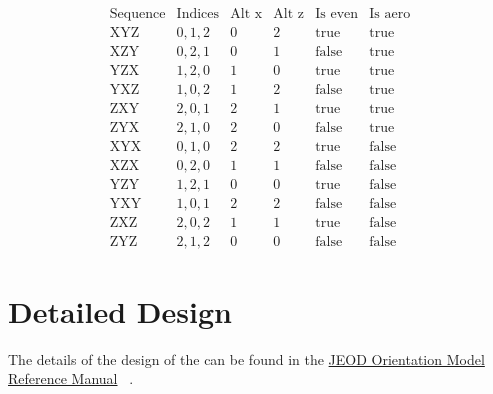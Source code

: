 \begin{equation*}
  \begin{array}{c|ccccc}
  \text{Sequence} & \text{Indices} & \text{Alt x} & \text{Alt z} &
    \text{Is even} & \text{Is aero} \\
  \hline
  \text{XYZ} & 0, 1, 2 & 0 & 2 & \text{true}  & \text{true}  \\
  \text{XZY} & 0, 2, 1 & 0 & 1 & \text{false} & \text{true}  \\
  \text{YZX} & 1, 2, 0 & 1 & 0 & \text{true}  & \text{true}  \\
  \text{YXZ} & 1, 0, 2 & 1 & 2 & \text{false} & \text{true}  \\
  \text{ZXY} & 2, 0, 1 & 2 & 1 & \text{true}  & \text{true}  \\
  \text{ZYX} & 2, 1, 0 & 2 & 0 & \text{false} & \text{true}  \\
  \text{XYX} & 0, 1, 0 & 2 & 2 & \text{true}  & \text{false} \\
  \text{XZX} & 0, 2, 0 & 1 & 1 & \text{false} & \text{false} \\
  \text{YZY} & 1, 2, 1 & 0 & 0 & \text{true}  & \text{false} \\
  \text{YXY} & 1, 0, 1 & 2 & 2 & \text{false} & \text{false} \\
  \text{ZXZ} & 2, 0, 2 & 1 & 1 & \text{true}  & \text{false} \\
  \text{ZYZ} & 2, 1, 2 & 0 & 0 & \text{false} & \text{false}
  \end{array}
\end{equation*}

\section{Detailed Design}

The details of the design of the \ModelDesc can be found in the
\hyperref{file:refman.pdf}{}{}
{JEOD Orientation Model Reference Manual} ~\cite{orientation_refman}.


